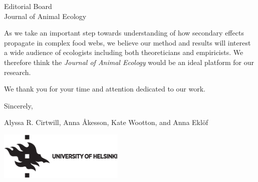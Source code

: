 \documentclass[10.5pt]{letter}
\begin{document}
\begin{letter}{
\vspace{-2.5cm}

Editorial Board\\
Journal of Animal Ecology}
As we take an important step towards understanding of how secondary effects propagate in complex food webs, we believe our method and results will interest a wide audience of ecologists including both theoreticians and empiricists. We therefore think the \emph{Journal of Animal Ecology} would be an ideal platform for our research.

We thank you for your time and attention dedicated to our work.


\vspace{2\parskip}

\hspace{4\parskip} Sincerely,

\hspace{4\parskip} Alyssa R. Cirtwill, Anna {\AA}kesson,  Kate Wootton, and Anna Ekl\"of

\vspace{4\parskip}
\centering
\includegraphics[width=60mm]{HY_logo_Eng.eps}


\end{letter} 
\end{document}
